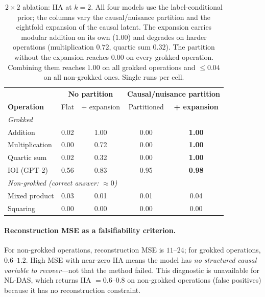 \documentclass{article}
\begin{document}
\begin{table}[t]
\centering
\small
\setlength{\tabcolsep}{4pt}
\begin{tabular}{@{}l|cc|cc@{}}
\toprule
& \multicolumn{2}{c|}{\textbf{No partition}}
& \multicolumn{2}{c}{\textbf{Causal/nuisance partition}} \\
\textbf{Operation} & Flat & + expansion & Partitioned & \textbf{+ expansion} \\
\midrule
\multicolumn{5}{l}{\textit{Grokked}} \\
Addition       & 0.02 & 1.00 & 0.00 & \textbf{1.00} \\
Multiplication & 0.00 & 0.72 & 0.00 & \textbf{1.00} \\
Quartic sum    & 0.02 & 0.32 & 0.00 & \textbf{1.00} \\
IOI (GPT-2)    & 0.56 & 0.83 & 0.95 & \textbf{0.98} \\
\midrule
\multicolumn{5}{l}{\textit{Non-grokked (correct answer: $\approx 0$)}} \\
Mixed product  & 0.03 & 0.01 & 0.01 & 0.04 \\
Squaring       & 0.00 & 0.00 & 0.00 & 0.00 \\
\bottomrule
\end{tabular}
\caption{$2{\times}2$ ablation: IIA at $k{=}2$. All four models use the
label-conditional prior; the columns vary the causal/nuisance partition and the
eightfold expansion of the causal latent. The expansion carries modular addition
on its own ($1.00$) and degrades on harder operations (multiplication $0.72$,
quartic sum $0.32$). The partition without the expansion reaches $0.00$ on every
grokked operation. Combining them reaches $1.00$ on all grokked operations and
$\leq 0.04$ on all non-grokked ones. Single runs per cell.}
\label{tab:ablation}
\end{table}

\paragraph{Reconstruction MSE as a falsifiability criterion.}
For non-grokked operations, reconstruction MSE is $11$--$24$; for grokked
operations, $0.6$--$1.2$.  High MSE with near-zero IIA means the model has
\emph{no structured causal variable to recover}---not that the method
failed.  This diagnostic is unavailable for NL-DAS, which returns IIA $=
0.6$--$0.8$ on non-grokked operations (false positives) because it has no
reconstruction constraint.
\end{document}
